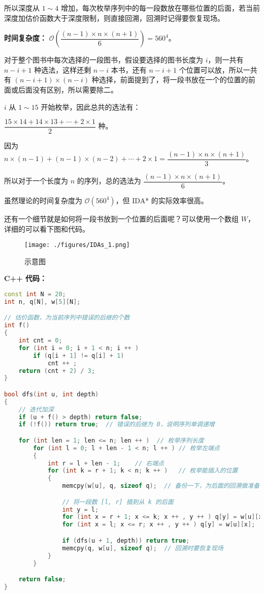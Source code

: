 所以深度从 $1 \sim 4$ 增加，每次枚举序列中的每一段数放在哪些位置的后面，若当前深度加估价函数大于深度限制，则直接回溯，回溯时记得要恢复现场。

\textbf{时间复杂度：} $\mathcal{O}(\dfrac{(n - 1) \times n \times (n + 1)}{6}) = 560^4$。

对于整个图书中每次选择的一段图书，假设要选择的图书长度为 $i$，则一共有 $n - i + 1$ 种选法，这样还剩 $n - i$ 本书，还有 $n - i + 1$ 个位置可以放，所以一共有 $(n - i + 1) \times (n - i)$ 种选择，前面提到了，将一段书放在一个的位置的前面或后面没有区别，所以需要除二。

$i$ 从 $1 \sim 15$ 开始枚举，因此总共的选法有：

$\dfrac{15 \times 14 + 14 \times 13 + \cdots + 2 \times 1}{2}$ 种。

因为 $n \times (n - 1) + (n - 1) \times (n - 2) + \cdots + 2 \times 1 = \dfrac{(n - 1) \times n \times (n + 1)}{3}$。

所以对于一个长度为 $n$ 的序列，总的选法为 $\dfrac{(n - 1) \times n \times (n + 1)}{6}$。

虽然理论的时间复杂度为 $\mathcal{O}(560^4)$，但 IDA* 的实际效率很高。

还有一个细节就是如何将一段书放到一个位置的后面呢？可以使用一个数组 $W$，详细的可以看下图和代码。

\begin{figure}[ht]
\centering
\texttt{[image: ./figures/IDAs\_1.png]}
\caption{示意图} \label{IDAs_fig1}
\end{figure}

\textbf{C++ 代码：}

\begin{lstlisting}[language=cpp]
const int N = 20;
int n, q[N], w[5][N];

// 估价函数，为当前序列中错误的后继的个数
int f()
{
    int cnt = 0;
    for (int i = 0; i + 1 < n; i ++ )
        if (q[i + 1] != q[i] + 1)
            cnt ++ ;
    return (cnt + 2) / 3;
}

bool dfs(int u, int depth)
{
    // 迭代加深
    if (u + f() > depth) return false;
    if (!f()) return true;  // 错误的后继为 0，说明序列单调递增

    for (int len = 1; len <= n; len ++ )  // 枚举序列长度
        for (int l = 0; l + len - 1 < n; l ++ ) // 枚举左端点
        {
            int r = l + len - 1;    // 右端点
            for (int k = r + 1; k < n; k ++ )   // 枚举能插入的位置
            {
                memcpy(w[u], q, sizeof q);  // 备份一下，为后面的回溯做准备

                // 将一段数 [l, r] 插到从 k 的后面
                int y = l;  
                for (int x = r + 1; x <= k; x ++ , y ++ ) q[y] = w[u][x];
                for (int x = l; x <= r; x ++ , y ++ ) q[y] = w[u][x];

                if (dfs(u + 1, depth)) return true;
                memcpy(q, w[u], sizeof q);  // 回溯时要恢复现场
            }
        }

    return false;
}
\end{lstlisting}

